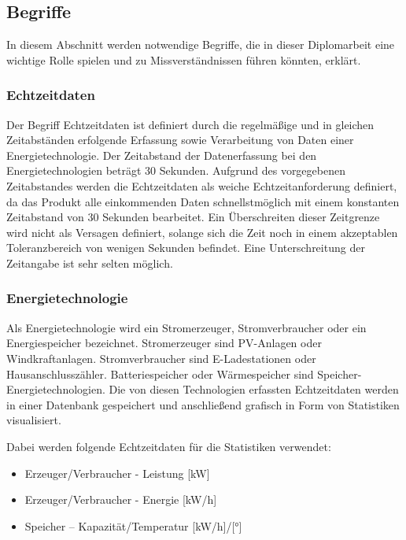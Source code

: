 \subsection{Begriffe}
In diesem Abschnitt werden notwendige Begriffe, die in dieser Diplomarbeit eine wichtige Rolle spielen und zu Missverständnissen führen könnten, erklärt.

\subsubsection{Echtzeitdaten} \label{sec:Echtzeitdaten}
Der Begriff Echtzeitdaten ist definiert durch die regelmäßige und in gleichen Zeitabständen erfolgende Erfassung sowie Verarbeitung von Daten einer Energietechnologie. Der Zeitabstand der Datenerfassung bei den Energietechnologien beträgt 30 Sekunden. Aufgrund des vorgegebenen Zeitabstandes werden die Echtzeitdaten als weiche Echtzeitanforderung definiert, da das Produkt alle einkommenden Daten schnellstmöglich mit einem konstanten Zeitabstand von 30 Sekunden bearbeitet. Ein Überschreiten dieser Zeitgrenze wird nicht als Versagen definiert, solange sich die Zeit noch in einem akzeptablen Toleranzbereich von wenigen Sekunden befindet. Eine Unterschreitung der Zeitangabe ist sehr selten möglich.  


\subsubsection{Energietechnologie} \label{sec:Energietechnologie}
Als Energietechnologie wird ein Stromerzeuger, Stromverbraucher oder ein Energiespeicher bezeichnet. Stromerzeuger sind PV-Anlagen oder Windkraftanlagen. Stromverbraucher sind E-Ladestationen oder Hausanschlusszähler. Batteriespeicher oder Wärmespeicher sind Speicher-Energietechnologien. Die von diesen Technologien erfassten Echtzeitdaten werden in einer Datenbank gespeichert und anschließend grafisch in Form von Statistiken visualisiert.

Dabei werden folgende Echtzeitdaten für die Statistiken verwendet:

\begin{itemize}
	\item Erzeuger/Verbraucher - Leistung [kW]
	\item Erzeuger/Verbraucher - Energie [kW/h]
	\item Speicher – Kapazität/Temperatur [kW/h]/[°]
\end{itemize}

